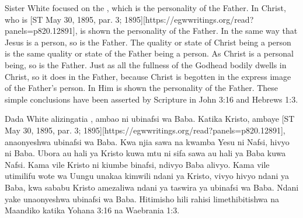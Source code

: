 \begin{table}[H]
\centering
\renewcommand{\arraystretch}{1.5}
\setlength{\tabcolsep}{15pt}
\end{table}


Sister White focused on the , which is the personality of the Father. In Christ, who is [ST May 30, 1895, par. 3; 1895][https://egwwritings.org/read?panels=p820.12891], is shown the personality of the Father. In the same way that Jesus is a person, so is the Father. The quality or state of Christ being a person is the same quality or state of the Father being a person. As Christ is a personal being, so is the Father. Just as all the fullness of the Godhead bodily dwells in Christ, so it does in the Father, because Christ is begotten in the express image of the Father’s person. In Him is shown the personality of the Father. These simple conclusions have been asserted by Scripture in John 3:16 and Hebrews 1:3.


Dada White alizingatia , ambao ni ubinafsi wa Baba. Katika Kristo, ambaye [ST May 30, 1895, par. 3; 1895][https://egwwritings.org/read?panels=p820.12891], anaonyeshwa ubinafsi wa Baba. Kwa njia sawa na kwamba Yesu ni Nafsi, hivyo ni Baba. Ubora au hali ya Kristo kuwa mtu ni sifa sawa au hali ya Baba kuwa Nafsi. Kama vile Kristo ni kiumbe binafsi, ndivyo Baba alivyo. Kama vile utimilifu wote wa Uungu unakaa kimwili ndani ya Kristo, vivyo hivyo ndani ya Baba, kwa sababu Kristo amezaliwa ndani ya taswira ya ubinafsi wa Baba. Ndani yake unaonyeshwa ubinafsi wa Baba. Hitimisho hili rahisi limethibitishwa na Maandiko katika Yohana 3:16 na Waebrania 1:3.


